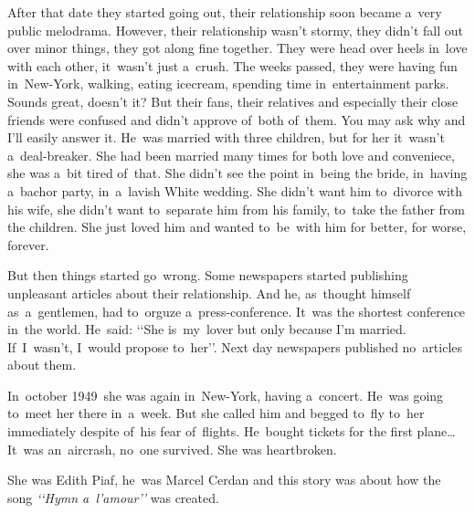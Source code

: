 After that date they started going out, their relationship soon became a~very public melodrama.
However, their relationship wasn't stormy, they didn't fall out over minor things, they got along fine together.
They were head over heels in~love with each other, it~wasn't just a~crush.
The weeks passed, they were having fun in~New-York, walking, eating icecream, spending time in~entertainment parks.
Sounds great, doesn't it? But their fans, their relatives and especially their close friends were confused and didn't approve of~both of~them.
You may ask why and I'll easily answer it.
He~was married with three children, but for her it~wasn't a~deal-breaker.
She had been married many times for both love and conveniece, she was a~bit tired of~that.
She didn't see the point in~being the bride, in~having a~bachor party, in~a~lavish White wedding.
She didn't want him to~divorce with his wife, she didn't want to~separate him from his family, to~take the father from the children.
She just loved him and wanted to~be~with him for better, for worse, forever.

But then things started go~wrong.
Some newspapers started publishing unpleasant articles about their relationship.
And he, as~thought himself as~a~gentlemen, had to~orguze a~press-conference.
It~was the shortest conference in~the world.
He~said: ‘‘She is~my~lover but only because I'm married.
If~I~wasn't, I~would propose to~her’’.
Next day newspapers published no~articles about them.

In~october 1949~she was again in~New-York, having a~concert.
He~was going to~meet her there in~a~week.
But she called him and begged to~fly to~her immediately despite of~his fear of~flights.
He~bought tickets for the first plane… It~was an~aircrash, no~one survived.
She was heartbroken.

She was Edith Piaf, he~was Marcel Cerdan and this story was about how the song \textit{‘‘Hymn a~l'amour’’} was created.